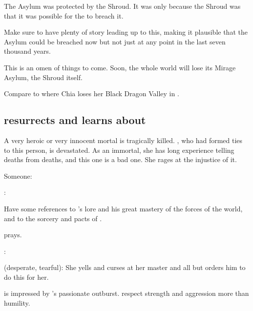 The Asylum was protected by the Shroud. 
It was only because the Shroud was  that it was possible for the \resphain{} to breach it. 

Make sure to have plenty of story leading up to this, making it plausible that the Asylum could be breached now but not just at any point in the last seven thousand years. 

This is an omen of things to come. 
Soon, the whole world will lose its Mirage Asylum, the Shroud itself. 

Compare to where Chia loses her Black Dragon Valley in . 









\subsection{\Ishnaruchaefir resurrects and learns about \iquin}
A very heroic or very innocent mortal is tragically killed. 
\Criseis, who had formed ties to this person, is devastated. 
As an immortal, she has long experience telling  deaths from  deaths, and this one is a bad one. 
She rages at the injustice of it.

Someone:

\Criseis:

Have some references to \Sethicus's lore and his great mastery of the forces of the world, and to the sorcery and pacts of \KhothSell. 

\Criseis prays. 

\Ishnaruchaefir:

\Criseis (desperate, tearful):
She yells and curses at her master and all but orders him to do this for her. 

\Ishnaruchaefir is impressed by \Criseis's passionate outburst.
\Dragons respect strength and aggression more than humility. 

